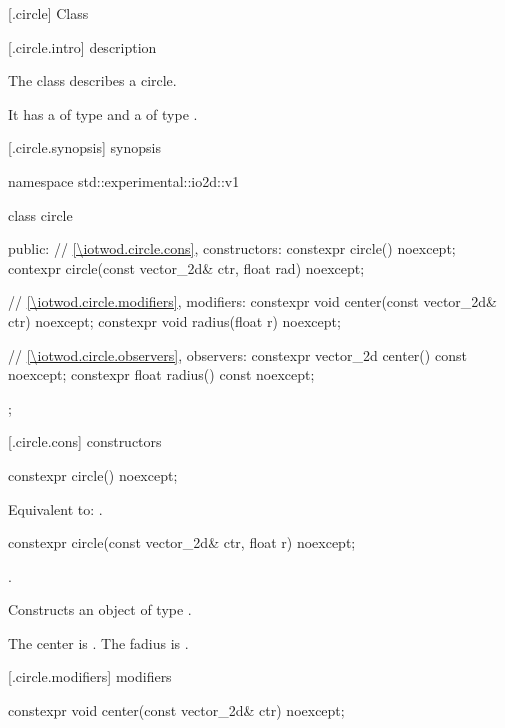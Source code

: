  [\iotwod.circle] {Class }

 [\iotwod.circle.intro] { description}

\pnum
{}%
The class  describes a circle.

\pnum
It has a  of type  and a  of type .

 [\iotwod.circle.synopsis] { synopsis}

\begin{codeblock}
namespace std::experimental::io2d::v1 {
  class circle {
  public:
    // \ref{\iotwod.circle.cons}, constructors:
    constexpr circle() noexcept;
    contexpr circle(const vector_2d& ctr, float rad) noexcept;

    // \ref{\iotwod.circle.modifiers}, modifiers:
    constexpr void center(const vector_2d& ctr) noexcept;
    constexpr void radius(float r) noexcept;
    
    // \ref{\iotwod.circle.observers}, observers:
    constexpr vector_2d center() const noexcept;
    constexpr float radius() const noexcept;
  };
}
\end{codeblock}

 [\iotwod.circle.cons] { constructors}

%
\begin{itemdecl}
constexpr circle() noexcept;
\end{itemdecl}
\begin{itemdescr}
\pnum
\effects
Equivalent to: .
\end{itemdescr}

%
\begin{itemdecl}
constexpr circle(const vector_2d& ctr, float r) noexcept;
\end{itemdecl}
\begin{itemdescr}
\requires
{}.

\pnum
\effects
Constructs an object of type .

\pnum
The center is . The fadius is .
\end{itemdescr}

 [\iotwod.circle.modifiers]{ modifiers}

%
\begin{itemdecl}
constexpr void center(const vector_2d& ctr) noexcept;
\end{itemdecl}

